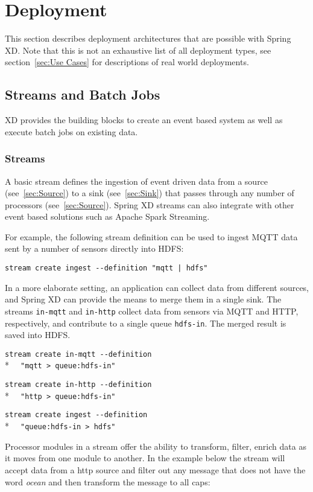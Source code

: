 \section{Deployment}
This section describes deployment architectures that are possible with Spring XD.
Note that this is not an exhaustive list of all 
deployment types, see section~\ref{sec:Use Cases} for descriptions of real 
world deployments.

\subsection{Streams and Batch Jobs}

XD provides the building blocks to create an event based system as well as
execute batch jobs on existing data.  

\subsubsection {Streams}
A basic stream defines the ingestion of event driven data from 
a source (see~\ref{sec:Source}) to a sink  (see~\ref{sec:Sink}) that passes 
through any number of processors (see~\ref{sec:Source}).  Spring XD streams can
also integrate with other event based solutions such as Apache Spark Streaming.

For example, the following stream definition can be used to ingest 
MQTT\cite{mqtt} data sent by a number of sensors directly into HDFS:

\verb;stream create ingest --definition "mqtt | hdfs";

In a more elaborate setting, an application can collect data from
different sources, and Spring XD can provide the means to merge them
in a single sink. The streams \texttt{in-mqtt} and \texttt{in-http}
collect data from sensors via MQTT and HTTP, respectively, and
contribute to a single queue \texttt{hdfs-in}. The merged result
is saved into HDFS.

\verb;stream create in-mqtt --definition ;\\*
\verb;  "mqtt > queue:hdfs-in";

\verb;stream create in-http --definition  ;\\*
\verb;  "http > queue:hdfs-in";

\verb;stream create ingest --definition  ;\\*
\verb;  "queue:hdfs-in > hdfs";

Processor modules in a stream offer the ability to transform, filter,
enrich data as it moves from one module to another.  In the example below
the stream will accept data from a http source and filter out any message
that does not have the word \emph{ocean} and then transform the message 
to all caps:

